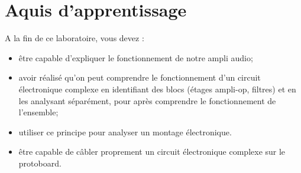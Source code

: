 \vspace{-5mm}
\section*{Aquis d'apprentissage}
\vspace{-5mm}
A la fin de ce laboratoire, vous devez :\\
\begin{itemize}
\item être capable d'expliquer le fonctionnement de notre ampli audio;
\item avoir réalisé qu'on peut comprendre le fonctionnement d'un circuit électronique complexe en identifiant des blocs (étages ampli-op, filtres) et en les analysant séparément, pour après comprendre le fonctionnement de l'ensemble;
\item utiliser ce principe pour analyser un montage électronique.
\item être capable de câbler proprement un circuit électronique complexe sur le protoboard.
\end{itemize}